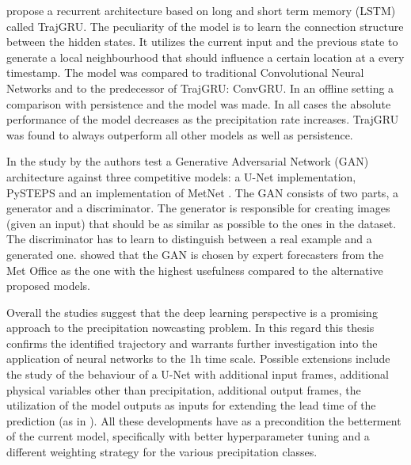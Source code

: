 \citet{Shi2017DeepModel} propose a recurrent architecture based on long and short term memory (LSTM) called TrajGRU. The peculiarity of the model is to learn the connection structure between the hidden states. It utilizes the current input and the previous state to generate a local neighbourhood that should influence a certain location at a every timestamp. The model was compared to traditional Convolutional Neural Networks and to the predecessor of TrajGRU: ConvGRU. In an offline setting a comparison with persistence and the model was made. In all cases the absolute performance of the model decreases as the precipitation rate increases. TrajGRU was found to always outperform all other models as well as persistence.

In the study by \citet{Ravuri2021SkillfulRadar} the authors test a Generative Adversarial Network (GAN) architecture against three competitive models: a U-Net implementation, PySTEPS \citep{Pulkkinen2019Pysteps:v1.0} and an implementation of MetNet \citep{Snderby2020MetNet:Forecasting}. The GAN consists of two parts, a generator and a discriminator. The generator is responsible for creating images (given an input) that should be as similar as possible to the ones in the dataset. The discriminator has to learn to distinguish between a real example and a generated one. \citet{Ravuri2021SkillfulRadar} showed that the GAN is chosen by expert forecasters from the Met Office as the one with the highest usefulness compared to the alternative proposed models. 

Overall the studies suggest that the deep learning perspective is a promising approach to the precipitation nowcasting problem. In this regard this thesis confirms the identified trajectory and warrants further investigation into the application of neural networks to the 1h time scale. Possible extensions include the study of the behaviour of a U-Net with additional input frames, additional physical variables other than precipitation, additional output frames, the utilization of the model outputs as inputs for extending the lead time of the prediction (as in \citet{Ayzel2020RainNetNowcasting}). All these developments have as a precondition the betterment of the current model, specifically with better hyperparameter tuning and a different weighting strategy for the various precipitation classes.